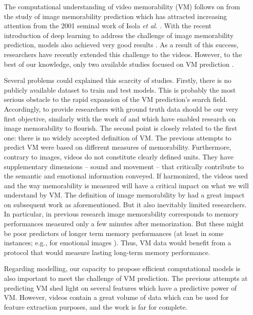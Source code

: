 \documentclass[sigconf]{acmart}
\begin{document}
The computational understanding of video memorability (VM) follows on from the study of image memorability prediction which has attracted increasing attention from the 2001 seminal work of Isola \textit{et al.} \cite{isola_2011_makes}.
With the recent introduction of deep learning to address the challenge of image memorability prediction, models also achieved very good results \cite{khosla_2015_understanding,baveye_2016_deep,squalli_2017_deep}.
As a result of this success, researchers have recently extended this challenge to the videos.
However, to the best of our knowledge, only two available studies focused on VM prediction \cite{han_2015_learning,shekhar_2017_show}.

Several problems could explained this scarcity of studies.
Firstly, there is no publicly available dataset to train and test models.
This is probably the most serious obstacle to the rapid expansion of the VM prediction's search field.
Accordingly, to provide researchers with ground truth data should be our very first objective, similarly with the work of \cite{isola_2011_makes} and \cite{khosla_2015_understanding} which have enabled research on image memorability to flourish.
The second point is closely related to the first one: there is no widely accepted definition of VM.
The previous attempts to predict VM \cite{han_2015_learning,shekhar_2017_show} were based on different measures of memorability.
Furthermore, contrary to images, videos do not constitute clearly defined units.
They have supplementary dimensions -- sound and movement -- that critically contribute to the semantic and emotional information conveyed.
If harmonized, the videos used and the way memorability is measured will have a critical impact on what we will understand by VM.
The definition of image memorability by \cite{isola_2011_makes} had a great impact on subsequent work as aforementioned.
But it also inevitably limited researchers.
In particular, in previous research image memorability corresponds to memory performances measured only a few minutes after memorization.
But these might be poor predictors of longer term memory performances (at least in some instances; e.g., for emotional images \cite{cohendet_2016_prediction}).
Thus, VM data would benefit from a protocol that would measure lasting long-term memory performance.

Regarding modelling, our capacity to propose efficient computational models is also important to meet the challenge of VM prediction. 
The previous attempts at predicting VM \cite{han_2015_learning,shekhar_2017_show} shed light on several features which have a predictive power of VM.
However, videos contain a great volume of data which can be used for feature extraction purposes, and the work is far for complete.
\end{document}

